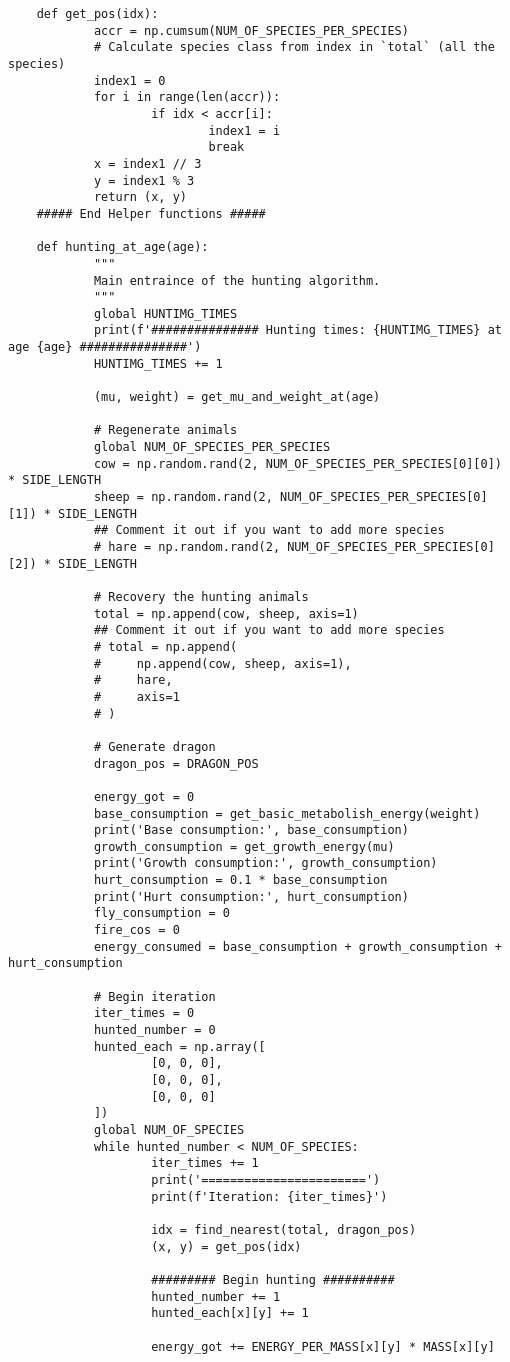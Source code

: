 \begin{lstlisting}
	def get_pos(idx):
			accr = np.cumsum(NUM_OF_SPECIES_PER_SPECIES)
			# Calculate species class from index in `total` (all the species)
			index1 = 0
			for i in range(len(accr)):
					if idx < accr[i]:
							index1 = i
							break
			x = index1 // 3
			y = index1 % 3
			return (x, y)
	##### End Helper functions #####
	
	def hunting_at_age(age):
			"""
			Main entraince of the hunting algorithm.
			"""
			global HUNTIMG_TIMES
			print(f'############### Hunting times: {HUNTIMG_TIMES} at age {age} ###############')
			HUNTIMG_TIMES += 1
	
			(mu, weight) = get_mu_and_weight_at(age)
	
			# Regenerate animals
			global NUM_OF_SPECIES_PER_SPECIES
			cow = np.random.rand(2, NUM_OF_SPECIES_PER_SPECIES[0][0]) * SIDE_LENGTH
			sheep = np.random.rand(2, NUM_OF_SPECIES_PER_SPECIES[0][1]) * SIDE_LENGTH
			## Comment it out if you want to add more species
			# hare = np.random.rand(2, NUM_OF_SPECIES_PER_SPECIES[0][2]) * SIDE_LENGTH
			
			# Recovery the hunting animals
			total = np.append(cow, sheep, axis=1)
			## Comment it out if you want to add more species
			# total = np.append(
			#     np.append(cow, sheep, axis=1),
			#     hare,
			#     axis=1
			# )
	
			# Generate dragon
			dragon_pos = DRAGON_POS
	
			energy_got = 0
			base_consumption = get_basic_metabolish_energy(weight)
			print('Base consumption:', base_consumption)
			growth_consumption = get_growth_energy(mu)
			print('Growth consumption:', growth_consumption)
			hurt_consumption = 0.1 * base_consumption
			print('Hurt consumption:', hurt_consumption)
			fly_consumption = 0
			fire_cos = 0
			energy_consumed = base_consumption + growth_consumption + hurt_consumption
			
			# Begin iteration
			iter_times = 0
			hunted_number = 0
			hunted_each = np.array([
					[0, 0, 0],
					[0, 0, 0],
					[0, 0, 0]
			])
			global NUM_OF_SPECIES
			while hunted_number < NUM_OF_SPECIES:
					iter_times += 1
					print('=======================')
					print(f'Iteration: {iter_times}')
	
					idx = find_nearest(total, dragon_pos)
					(x, y) = get_pos(idx)
	
					######### Begin hunting ##########
					hunted_number += 1
					hunted_each[x][y] += 1
	
					energy_got += ENERGY_PER_MASS[x][y] * MASS[x][y]
	

\end{lstlisting}
